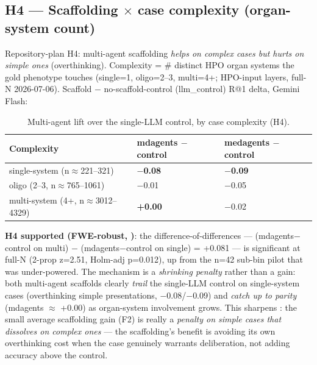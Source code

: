 \subsection{H4 --- Scaffolding \ensuremath{\times} case complexity (organ-system count)}\label{sec-7-8}

Repository-plan H4: multi-agent scaffolding \emph{helps on complex cases but hurts on
simple ones} (overthinking). Complexity = \# distinct HPO organ systems the gold
phenotype touches (single=1, oligo=2--3, multi=4+; HPO-input layers, full-N
2026-07-06). Scaffold \ensuremath{-} no-scaffold-control (llm\_control) R@1 delta, Gemini Flash:

\begin{table}[t]
\centering\scriptsize\setlength{\tabcolsep}{3.5pt}
\caption{Multi-agent lift over the single-LLM control, by case complexity (H4).}\label{tbl:h4}
\begin{tabular}{@{}
lll@{}}
\toprule
Complexity & mdagents \ensuremath{-} control & medagents \ensuremath{-} control \\
\midrule
single-system (n\ensuremath{\approx}221--321) & \textbf{\ensuremath{-}0.08} & \textbf{\ensuremath{-}0.09} \\
oligo (2--3, n\ensuremath{\approx}765--1061) & \ensuremath{-}0.01 & \ensuremath{-}0.05 \\
multi-system (4+, n\ensuremath{\approx}3012--4329) & \textbf{+0.00} & \ensuremath{-}0.02 \\
\bottomrule
\end{tabular}
\end{table}

\textbf{H4 supported (FWE-robust, )}: the difference-of-differences ---
(mdagents\ensuremath{-}control on multi) \ensuremath{-} (mdagents\ensuremath{-}control on single) = +0.081 --- is
significant at full-N (2-prop z=2.51, Holm-adj p=0.012), up from the n=42
sub-bin pilot that was under-powered. The mechanism is a \emph{shrinking penalty}
rather than a gain: both multi-agent scaffolds clearly \emph{trail} the single-LLM
control on single-system cases (overthinking simple presentations, \ensuremath{-}0.08/\ensuremath{-}0.09)
and \emph{catch up to parity} (mdagents \ensuremath{\approx} +0.00) as organ-system involvement grows.
This sharpens : the small average scaffolding gain (F2) is really a \emph{penalty
on simple cases that dissolves on complex ones} --- the scaffolding's benefit is
avoiding its own overthinking cost when the case genuinely warrants deliberation,
not adding accuracy above the control.

